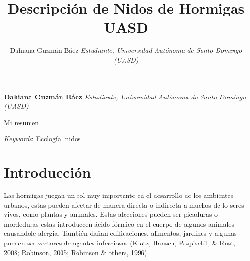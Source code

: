 \documentclass[11pt,]{article}
\title{Descripción de Nidos de Hormigas UASD  }
\author{\Large Dahiana Guzmán Báez\vspace{0.05in} \newline\normalsize\emph{Estudiante, Universidad Autónoma de Santo Domingo (UASD)}  }
\date{}
\newcommand*{\authorfont}{\fontfamily{phv}\selectfont}
\renewenvironment{abstract}
 {{%
    \setlength{\leftmargin}{0mm}
    \setlength{\rightmargin}{\leftmargin}%
  }%
  \relax}
 {\endlist}
\begin{document}
	
%

{%
\setlength{\parindent}{0pt}
\thispagestyle{plain}
{\fontsize{18}{20}\selectfont\raggedright 
\maketitle  %

}

{
   \vskip 13.5pt\relax \normalsize\fontsize{11}{12} 
\textbf{\authorfont Dahiana Guzmán Báez} \hskip 15pt \emph{\small Estudiante, Universidad Autónoma de Santo Domingo (UASD)}   

}

}








\begin{abstract}

    \hbox{\vrule height .2pt width 39.14pc}

    \vskip 8.5pt %

\noindent Mi resumen


\vskip 8.5pt \noindent \emph{Keywords}: Ecología, nidos \par

    \hbox{\vrule height .2pt width 39.14pc}



\end{abstract}


\vskip 6.5pt


\noindent  \section{Introducción}\label{introducciuxf3n}

Las hormigas juegan un rol muy importante en el desarrollo de los
ambientes urbanos, estas pueden afectar de manera directa o indirecta a
muchos de lo seres vivos, como plantas y animales. Estas afecciones
pueden ser picaduras o mordeduras estas introduccen ácido fórmico en el
cuerpo de algunos animales causandole alergia. También dañan
edificaciones, alimentos, jardines y algunas pueden ser vectores de
agentes infecciosos (Klotz, Hansen, Pospischil, \& Rust, 2008; Robinson,
2005; Robinson \& others, 1996).
\end{document}
